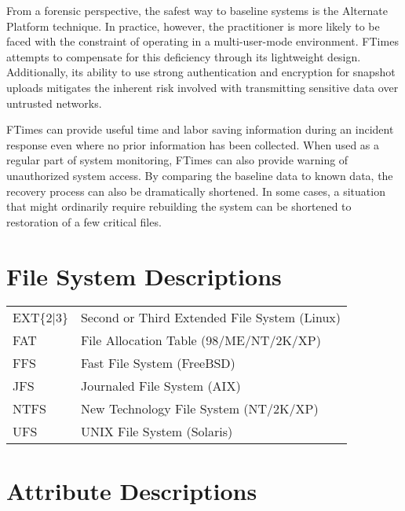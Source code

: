 \documentclass[10pt]{article}
\begin{document}
From a forensic perspective, the safest way to baseline systems is
the Alternate Platform technique.  In practice, however, the
practitioner is more likely to be faced with the constraint of
operating in a multi-user-mode environment.  FTimes attempts to
compensate for this deficiency through its lightweight design.
Additionally, its ability to use strong authentication and encryption
for snapshot uploads mitigates the inherent risk involved with
transmitting sensitive data over untrusted networks.

FTimes can provide useful time and labor saving information during
an incident response even where no prior information has been
collected.  When used as a regular part of system monitoring, FTimes
can also provide warning of unauthorized system access.  By comparing
the baseline data to known data, the recovery process can also be
dramatically shortened.  In some cases, a situation that might
ordinarily require rebuilding the system can be shortened to
restoration of a few critical files.

\newpage
\appendix
\section{File System Descriptions}

\begin{center}
\begin{supertabular}{lp{4.75in}}
EXT\{2$\mid$3\}
&
Second or Third Extended File System (Linux)
\\[.5em]
FAT
&
File Allocation Table (98/ME/NT/2K/XP)
\\[.5em]
FFS
&
Fast File System (FreeBSD)
\\[.5em]
JFS
&
Journaled File System (AIX)
\\[.5em]
NTFS
&
New Technology File System (NT/2K/XP)
\\[.5em]
UFS
&
UNIX File System (Solaris)
\\[.5em]
\end{supertabular}
\end{center}

\section{Attribute Descriptions}
\end{document}
